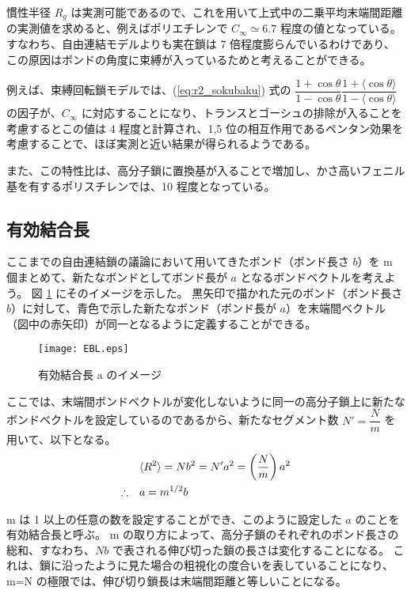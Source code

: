 \documentclass[a4paper,11pt]{jlreq}
\begin{document}
慣性半径 $R_g$ は実測可能であるので、これを用いて上式中の二乗平均末端間距離の実測値を求めると、例えばポリエチレンで $C_{\infty} \simeq 6.7$ 程度の値となっている。
すなわち、自由連結モデルよりも実在鎖は 7 倍程度膨らんでいるわけであり、この原因はボンドの角度に束縛が入っているためと考えることができる。

例えば、束縛回転鎖モデルでは、(\ref{eq:r2_sokubaku}) 式の $\dfrac{1+\cos \theta}{1-\cos \theta} \dfrac{1+ \langle \cos \theta \rangle}{1- \langle \cos \theta \rangle}$ の因子が、$C_{\infty}$ に対応することになり、トランスとゴーシュの排除が入ることを考慮するとこの値は 4 程度と計算され、1,5 位の相互作用であるペンタン効果を考慮することで、ほぼ実測と近い結果が得られるようである。

また、この特性比は、高分子鎖に置換基が入ることで増加し、かさ高いフェニル基を有するポリスチレンでは、10 程度となっている。



\subsection{有効結合長}

ここまでの自由連結鎖の議論において用いてきたボンド（ボンド長さ $b$）を m 個まとめて、新たなボンドとしてボンド長が $a$ となるボンドベクトルを考えよう。
図 \ref{fig: EBL} にそのイメージを示した。
黒矢印で描かれた元のボンド（ボンド長さ $b$）に対して、青色で示した新たなボンド（ボンド長が $a$）を末端間ベクトル（図中の赤矢印）が同一となるように定義することができる。
\begin{figure}[htb]
 \centering
	\texttt{[image: EBL.eps]}
	\caption{有効結合長 a のイメージ}
	\label{fig: EBL}
\end{figure}

ここでは、末端間ボンドベクトルが変化しないように同一の高分子鎖上に新たなボンドベクトルを設定しているのであるから、新たなセグメント数 $N'=\dfrac{N}{m}$ を用いて、以下となる。
\begin{align}
&\langle R^2 \rangle = N b^2 = N' a^2 = \left(\dfrac{N}{m}\right) a^2 \notag \\
\therefore \quad &a = m^{1/2} b
\label{eq:EBL}
\end{align}

m は 1 以上の任意の数を設定することができ、このように設定した $a$ のことを有効結合長と呼ぶ。 
m の取り方によって、高分子鎖のそれぞれのボンド長さの総和、すなわち、$Nb$ で表される伸び切った鎖の長さは変化することになる。
これは、鎖に沿ったように見た場合の粗視化の度合いを表していることになり、m=N の極限では、伸び切り鎖長は末端間距離と等しいことになる。
\end{document}
